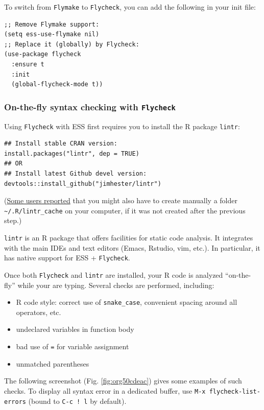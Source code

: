 \documentclass[11pt]{article}
\begin{document}
To switch from \texttt{Flymake} to \texttt{Flycheck}, you can add the following in your init file:

\begin{verbatim}
;; Remove Flymake support:
(setq ess-use-flymake nil)
;; Replace it (globally) by Flycheck:
(use-package flycheck
  :ensure t
  :init
  (global-flycheck-mode t))
\end{verbatim}

\subsubsection{On-the-fly syntax checking with \texttt{Flycheck}}
\label{sec:orge85a15b}
Using \texttt{Flycheck} with ESS first requires you to install the R package \texttt{lintr}:

\begin{verbatim}
## Install stable CRAN version:
install.packages("lintr", dep = TRUE)
## OR
## Install latest Github devel version:
devtools::install_github("jimhester/lintr")
\end{verbatim}

(\href{https://emacs.stackexchange.com/questions/53018/flycheck-r-lintr-doesnt-find-anything}{Some users reported} that you might also have to create manually a folder \texttt{\textasciitilde{}/.R/lintr\_cache} on your computer, if it was not created after the previous step.)

\texttt{lintr} is an R package that offers facilities for static code analysis. It integrates with the main IDEs and text editors (Emacs, Rstudio, vim, etc.). In particular, it has native support for ESS + \texttt{Flycheck}.

Once both \texttt{Flycheck} and \texttt{lintr} are installed, your R code is analyzed ``on-the-fly'' while your are typing. Several checks are performed, including:
\begin{itemize}
\item R code style: correct use of \texttt{snake\_case}, convenient spacing around all operators, etc.
\item undeclared variables in function body
\item bad use of \texttt{=} for variable assignment
\item unmatched parentheses
\end{itemize}

The following screenshot (Fig. \ref{fig:org50cdeac}) gives some examples of such checks. To display all syntax error in a dedicated buffer, use \texttt{M-x flycheck-list-errors} (bound to \texttt{C-c ! l} by default).
\end{document}

